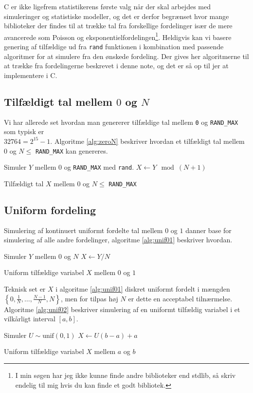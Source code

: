 C er ikke ligefrem statistikerens første valg når der skal arbejdes med simuleringer og statistiske modeller, og det er derfor begrænset hvor mange biblioteker der findes til at trække tal fra forskellige fordelinger især de mere avancerede som Poisson og eksponentielfordelingen\footnote{I min søgen har jeg ikke kunne finde andre biblioteker end stdlib, så skriv endelig til mig hvis du kan finde et godt bibliotek.}. Heldigvis kan vi basere genering af tilfældige ud fra \texttt{rand} funktionen i kombination med passende algoritmer for at simulere fra den ønskede fordeling. Der gives her algoritmerne til at trække fra fordelingerne beskrevet i denne note, og det er så op til jer at implementere i C. 
\subsection{Tilfældigt tal mellem $0$ og $N$}
Vi har allerede set hvordan man genererer tilfældige tal mellem \texttt{0} og \texttt{RAND\_MAX} som typisk er \\ 
$32764 = 2^{15} - 1$. Algoritme \ref{alg:zeroN} beskriver hvordan et tilfældigt tal mellem $0$ og $N \leq$ \texttt{RAND\_MAX} kan genereres.
\begin{algorithm}[H]
\begin{algorithmic}
\STATE Simuler $Y$ mellem $0$ og \texttt{RAND\_MAX} med \texttt{rand}. 
\STATE $X \gets Y \mod (N + 1)$ 
\end{algorithmic}
\caption{Tilfældigt tal $X$ mellem $0$ og $N \leq$ \texttt{RAND\_MAX}} \label{alg:zeroN}
\end{algorithm}
\subsection{Uniform fordeling}
Simulering af kontinuert uniformt fordelte tal mellem $0$ og $1$ danner base for simulering af alle andre fordelinger, algoritme \ref{alg:unif01} beskriver hvordan. 
\begin{algorithm}[H]
\begin{algorithmic}
\STATE Simuler $Y$ mellem $0$ og $N$
\STATE $X \gets Y/N$
\end{algorithmic}
\caption{Uniform tilfældige variabel $X$ mellem $0$ og $1$} \label{alg:unif01}
\end{algorithm}
Teknisk set er $X$ i algoritme \ref{alg:unif01} diskret uniformt fordelt i mængden $\left\{0, \frac{1}{N},\dots,\frac{N-1}{N},N \right\}$, men for tilpas høj $N$ er dette en acceptabel tilnærmelse. Algoritme \ref{alg:unif02} beskriver simulering af en uniformt tilfældig variabel i et vilkårligt interval $[a,b]$. 
\begin{algorithm}[H]
\begin{algorithmic}
\STATE Simuler $U \sim \text{unif}(0,1)$
\STATE $X \gets U(b-a) + a$
\end{algorithmic}
\caption{Uniform tilfældige variabel $X$ mellem $a$ og $b$} \label{alg:unif02}
\end{algorithm}

